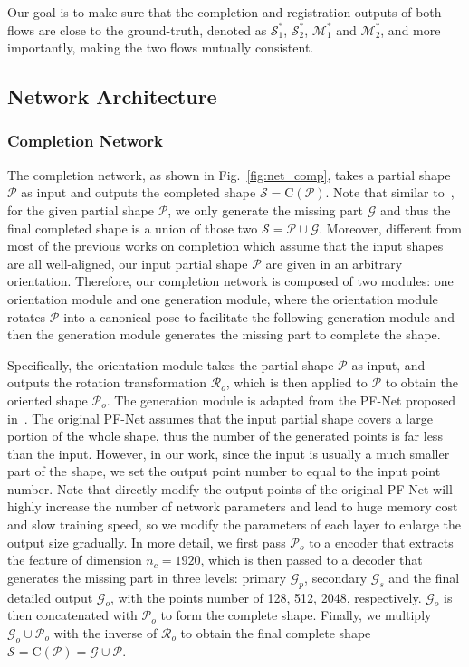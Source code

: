 Our goal is to make sure that the completion and registration outputs of both flows are close to the ground-truth, denoted as  $\mathcal{S}_1^{*}$, $\mathcal{S}_2^{*}$, $\mathcal{M}_1^{*}$ and $\mathcal{M}_2^{*}$, and more importantly, making the two flows mutually consistent. 




\subsection{Network Architecture}

\subsubsection{Completion Network}

The completion network, as shown in Fig.~\ref{fig:net_comp}, takes a partial shape $\mathcal{P}$ as input and outputs the completed shape $\mathcal{S} = \text{C}(\mathcal{P})$. Note that similar to~\cite{huang2020pf}, for the given partial shape $\mathcal{P}$, we only generate the missing part $\mathcal{G}$ and thus the final completed shape is a union of those two  $\mathcal{S} =\mathcal{P} \cup \mathcal{G} $. Moreover, different from most of the previous works on completion which assume that the input shapes are all well-aligned, our input partial shape $\mathcal{P}$ are given in an arbitrary orientation. Therefore, our completion network is composed of two modules: one orientation module and one generation module, where the orientation module rotates $\mathcal{P}$ into a canonical pose to facilitate the following generation module and then the generation module generates the missing part to complete the shape. 

Specifically, the orientation module takes the partial shape $\mathcal{P}$ as input, and outputs the rotation transformation $\mathcal{R}_o$, which is then applied to $\mathcal{P}$ to obtain the oriented shape $\mathcal{P}_o$. 
The generation module is adapted from the PF-Net proposed in~\cite{huang2020pf}. The original PF-Net assumes that the input partial shape covers a large portion of the whole shape, thus the number of the generated points is far less than the input.
However, in our work, since the input is usually a much smaller part of the shape, we set the output point number to equal to the input point number. Note that directly modify the output points of the original PF-Net will highly increase the number of network parameters and lead to huge memory cost and slow training speed, so we modify the parameters of each layer to enlarge the output size gradually.
In more detail, we first pass $\mathcal{P}_o$ to a encoder that extracts the feature of dimension $n_c=1920$, which is then passed to a decoder that generates the missing part in three levels: primary $\mathcal{G}_p$, secondary $\mathcal{G}_s$ and the final detailed output $\mathcal{G}_o$, with the points number of 128, 512, 2048, respectively. $\mathcal{G}_o$ is then concatenated with $\mathcal{P}_o$ to form the complete shape. Finally, we multiply $\mathcal{G}_o \cup \mathcal{P}_o$ with the inverse of $\mathcal{R}_o$ to obtain the final complete shape $\mathcal{S}= \text{C}(\mathcal{P}) = \mathcal{G} \cup \mathcal{P} $.


